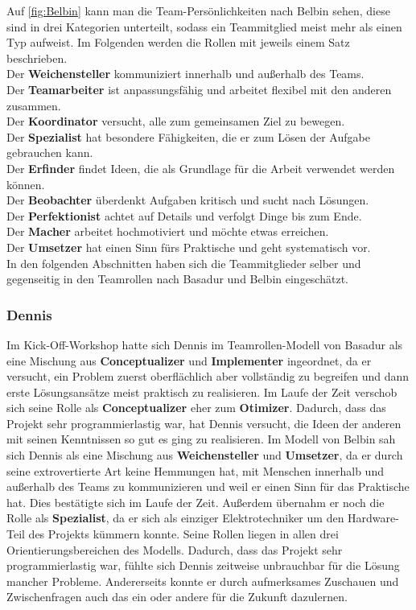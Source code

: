 \documentclass[a4paper,12pt,headsepline]{scrartcl}
\begin{document}
		Auf \cref{fig:Belbin} kann man die Team-Persönlichkeiten nach Belbin sehen, diese sind in drei Kategorien unterteilt, sodass ein Teammitglied meist mehr als einen Typ aufweist. Im Folgenden werden die Rollen mit jeweils einem Satz beschrieben.\\
		Der \textbf{Weichensteller} kommuniziert innerhalb und außerhalb des Teams.\\
		Der \textbf{Teamarbeiter} ist anpassungsfähig und arbeitet flexibel mit den anderen zusammen.\\
		Der \textbf{Koordinator} versucht, alle zum gemeinsamen Ziel zu bewegen.\\
		Der \textbf{Spezialist} hat besondere Fähigkeiten, die er zum Lösen der Aufgabe gebrauchen kann.\\
		Der \textbf{Erfinder} findet Ideen, die als Grundlage für die Arbeit verwendet werden können.\\
		Der \textbf{Beobachter} überdenkt Aufgaben kritisch und sucht nach Lösungen.\\
		Der \textbf{Perfektionist} achtet auf Details und verfolgt Dinge bis zum Ende.\\
		Der \textbf{Macher} arbeitet hochmotiviert und möchte etwas erreichen.\\
		Der \textbf{Umsetzer} hat einen Sinn fürs Praktische und geht systematisch vor.\\
		
		In den folgenden Abschnitten haben sich die Teammitglieder selber und gegenseitig in den Teamrollen nach Basadur und Belbin eingeschätzt.
		\subsubsection{Dennis}
Im Kick-Off-Workshop hatte sich Dennis im Teamrollen-Modell von Basadur als eine Mischung aus \textbf{Conceptualizer} und \textbf{Implementer} ingeordnet, da er versucht, ein Problem zuerst oberflächlich aber vollständig zu begreifen und dann erste Lösungsansätze meist praktisch zu realisieren. Im Laufe der Zeit verschob sich seine Rolle als \textbf{Conceptualizer} eher zum \textbf{Otimizer}. Dadurch, dass das Projekt sehr programmierlastig war, hat Dennis versucht, die Ideen der anderen mit seinen Kenntnissen so gut es ging zu realisieren. Im Modell von Belbin sah sich Dennis als eine Mischung aus \textbf{Weichensteller} und \textbf{Umsetzer}, da er durch seine extrovertierte Art keine Hemmungen hat, mit Menschen innerhalb und außerhalb des Teams zu kommunizieren und weil er einen Sinn für das Praktische hat. Dies bestätigte sich im Laufe der Zeit. Außerdem übernahm er noch die Rolle als \textbf{Spezialist}, da er sich als einziger Elektrotechniker um den Hardware-Teil des Projekts kümmern konnte. Seine Rollen liegen in allen drei Orientierungsbereichen des Modells. Dadurch, dass das Projekt sehr programmierlastig war, fühlte sich Dennis zeitweise unbrauchbar für die Lösung mancher Probleme. Andererseits konnte er durch aufmerksames Zuschauen und Zwischenfragen auch das ein oder andere für die Zukunft dazulernen.
\end{document}
